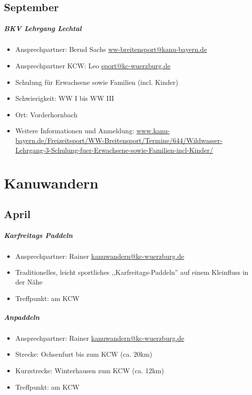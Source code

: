 \documentclass[12pt, a4paper]{report}
\begin{document}
\section*{September}\paragraph{BKV Lehrgang Lechtal}
\begin{itemize}
    \item Ansprechpartner: Bernd Sachs \href{mailto:ww-breitensport@kanu-bayern.de}{ww-breitensport@kanu-bayern.de}
    \item Ansprechpartner KCW: Leo \href{mailto:sport@kc-wuerzburg.de}{sport@kc-wuerzburg.de}
    \item Schulung für Erwachsene sowie Familien (incl. Kinder)
    \item Schwierigkeit: WW I bis WW III
    \item Ort: Vorderhornbach
    \item Weitere Informationen und Anmeldung: \url{www.kanu-bayern.de/Freizeitsport/WW-Breitensport/Termine/644/Wildwasser-Lehrgang-3-Schulung-fuer-Erwachsene-sowie-Familien-incl-Kinder/}
\end{itemize}


\chapter*{Kanuwandern}
\thispagestyle{Kanuwandern}
\pagestyle{Kanuwandern}
\section*{April}\paragraph{Karfreitags Paddeln}
\begin{itemize}
    \item Ansprechpartner: Rainer \href{mailto:kanuwandern@kc-wuerzburg.de}{kanuwandern@kc-wuerzburg.de}
    \item Traditionelles, leicht sportliches ,,Karfreitags-Paddeln'' auf einem Kleinfluss in der Nähe
    \item Treffpunkt: am KCW
\end{itemize}

\paragraph{Anpaddeln}
\begin{itemize}
    \item Ansprechpartner: Rainer \href{mailto:kanuwandern@kc-wuerzburg.de}{kanuwandern@kc-wuerzburg.de}
    \item Strecke: Ochsenfurt bis zum KCW (ca. 20km)
    \item Kurzstrecke: Winterhausen zum KCW (ca. 12km)
    \item Treffpunkt: am KCW
\end{itemize}
\end{document}
